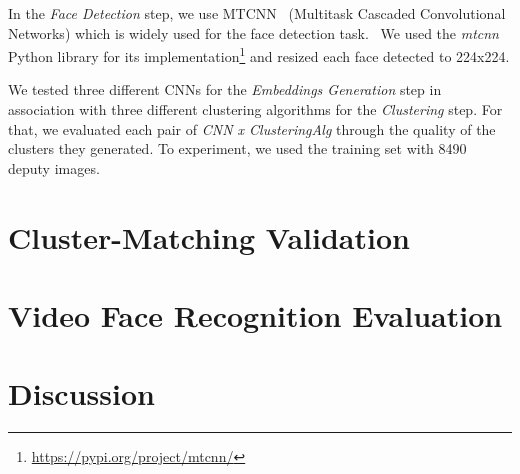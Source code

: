 In the \emph{Face Detection} step, we use MTCNN~\cite{mtcnn} (Multitask
Cascaded Convolutional Networks) which is widely used for the face detection task.~\cite{mtcnn1, mtcnn3}
We used the  \emph{mtcnn} Python library for its implementation\footnote{\url{https://pypi.org/project/mtcnn/}} and resized each face detected to 224x224.

We tested three different CNNs for the \emph{Embeddings Generation} step in association with three different clustering algorithms for the \emph{Clustering} step.
For that, we evaluated each pair of \emph{CNN x ClusteringAlg} through the quality of the clusters they generated. 
To experiment, we used the training set with 8490 deputy images.






\section{Cluster-Matching Validation}
\label{sec:recognition_matching_validation}

\section{Video Face Recognition Evaluation}
\label{sec:recognition_video_evaluation}

\section{Discussion}
\label{sec:recognition_discussion}
